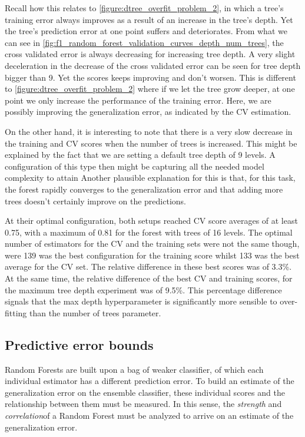 Recall how this relates to \cref{figure:dtree_overfit_problem_2}, in which a tree's training error always improves as a result of an increase in the tree's depth.
Yet the tree's prediction error at one point suffers and deteriorates.
From what we can see in \cref{fig:f1_random_forest_validation_curves_depth_num_trees}, the cross validated error is always decreasing for increasing tree depth.
A very slight deceleration in the decrease of the cross validated error can be seen for tree depth bigger than 9.
Yet the scores keeps improving and don't worsen.
This is different to \cref{figure:dtree_overfit_problem_2} where if we let the tree grow deeper, at one point we only increase the performance of the training error.
Here, we are possibly improving the generalization error, as indicated by the CV estimation.

 On the other hand, it is interesting to note that there is a very slow decrease in the training and CV scores when the number of trees is increased.
 This might be explained by the fact that we are setting a default tree depth of 9 levels.
 A configuration of this type then might be capturing all the needed model complexity to attain
 Another plausible explanation for this is that, for this task, the forest rapidly converges to the generalization error and that adding more trees doesn't certainly improve on the predictions.


At their optimal configuration, both setups reached CV score averages of at least 0.75, with a maximum of 0.81 for the forest
with trees of 16 levels.
The optimal number of estimators for the CV and the training sets were not the same though, were 139 was the best configuration for the training score whilst 133 was the best average for the CV set. The relative difference in these best scores was of 3.3\%.
At the same time, the relative difference of the best CV and training scores, for the maximum tree depth experiment was of 9.5\%.
This percentage difference signals that the max depth hyperparameter is significantly more sensible to over-fitting than the number of trees parameter.


\subsection{Predictive error bounds}

Random Forests are built upon a bag of weaker classifier, of which each individual estimator has a different prediction error.
To build an estimate of the generalization error on the ensemble classifier, these individual scores and the relationship between them must be measured.
In this sense, the \textit{strength} and \textit{correlation}of a Random Forest must be analyzed to arrive on an estimate of the generalization error.

